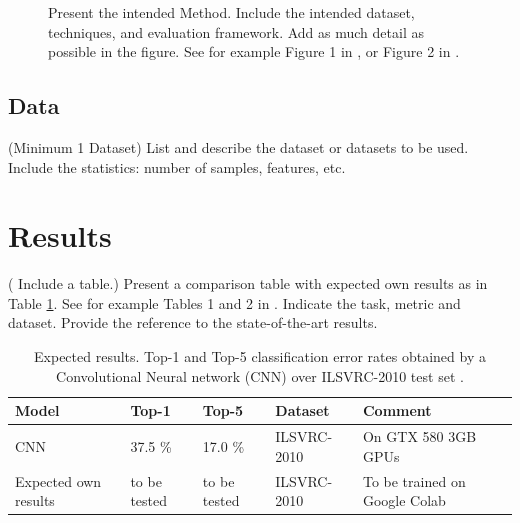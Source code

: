 \documentclass[11pt,a4paper]{article}
\begin{document}
\begin{figure}[h]
	\centering
	\caption[The intended Method]{Present the intended Method. Include the intended dataset, techniques, and evaluation framework. Add as much detail as possible in the figure. See for example Figure 1 in , or Figure 2 in .}
	\label{fig:2}
\end{figure}


\subsection{Data}
({\color{blue}Minimum 1 Dataset}) List and describe the dataset or datasets to be used. Include the statistics: number of samples, features, etc.
\newpage
\section{Results}

({\color{blue} Include a table.}) Present a comparison table with expected own results as in Table \ref{table:2}. See for example Tables 1 and 2 in . Indicate the task, metric and dataset. Provide the reference to the state-of-the-art results.

\begin{table}[h!]
\centering
\begin{tabular}{|l|l|l|l|l|}
\hline
\textbf{Model} & \textbf{ Top-1} & \textbf{Top-5} & \textbf{Dataset} & \textbf{Comment} \\ \hline
CNN \cite{krizhevsky2017imagenet}                 &    37.5 \%           &       17.0 \%               &      ILSVRC-2010             &     On  GTX 580 3GB GPUs           \\ \hline
Expected own results  &     to be tested         &            to be tested          &       ILSVRC-2010            &       To be trained on Google Colab         \\ \hline
\end{tabular}
\caption{Expected results. Top-1 and Top-5 classification error rates obtained by a Convolutional Neural network (CNN) \protect\cite[p.~7]{krizhevsky2017imagenet} over ILSVRC-2010 test set \protect\cite{berg2010large}.}
\label{table:2}

\end{table}
\end{document}
